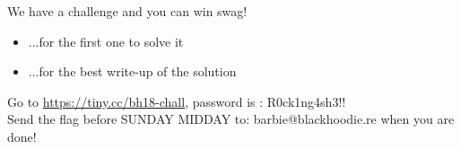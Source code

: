 We have a challenge and you can win swag!
\begin{itemize}
\item ...for the first one to solve it
\item ...for the best write-up of the solution
\end{itemize}

Go to \url{https://tiny.cc/bh18-chall}, password is : R0ck1ng4sh3!!\\

Send the flag before SUNDAY MIDDAY to: barbie@blackhoodie.re when you are done!

